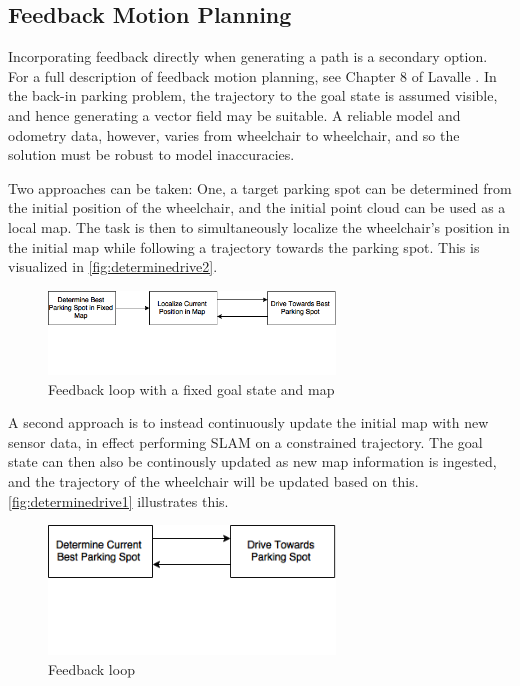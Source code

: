\subsection{Feedback Motion Planning}
Incorporating feedback directly when generating a path is a secondary option. 
For a full description of feedback motion planning, see Chapter 8 of Lavalle
\cite{lavalle2006planning}.
In the back-in parking problem, the trajectory to the goal state is assumed
visible, and hence generating a vector field may be suitable. A reliable model
and odometry data, however, varies from wheelchair to wheelchair, and so the
solution must be robust to model inaccuracies.

Two approaches can be taken: One, a target parking spot can be determined from
the initial position of the wheelchair, and the initial point cloud can be used
as a local map. The task is then to simultaneously localize the wheelchair's
position in the initial map while following a trajectory towards the parking
spot. This is visualized in \autoref{fig:determinedrive2}.
 
\begin{figure} %
\centering
\includegraphics[width=3in]{figures/determinedrive2.png}
\caption{Feedback loop with a fixed goal state and map}
\label{fig:determinedrive2}
\end{figure}   %

A second approach is to instead continuously update the initial map with new
sensor data, in effect performing SLAM on a constrained trajectory. The goal
state can then also be continously updated as new map information is ingested,
and the trajectory of the wheelchair will be updated based on this.
\autoref{fig:determinedrive1} illustrates this.
 
\begin{figure} %
\centering
\includegraphics[width=3in]{figures/determinedrive1.png}
\caption{Feedback loop}
\label{fig:determinedrive1}
\end{figure}   %

